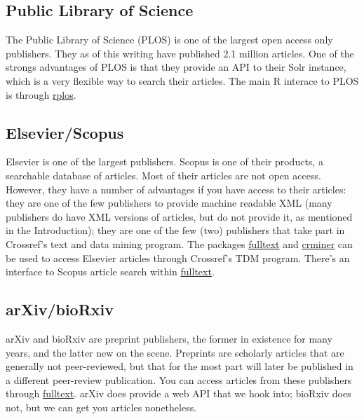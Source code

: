 \documentclass[author-year, review, 11pt]{components/elsarticle} %
\begin{document}
\hypertarget{public-library-of-science}{%
\subsection{Public Library of Science}\label{public-library-of-science}}

The Public Library of Science (PLOS) is one of the largest open access
only publishers. They as of this writing have published 2.1 million
articles. One of the strongs advantages of PLOS is that they provide an
API to their Solr instance, which is a very flexible way to search their
articles. The main R interace to PLOS is through
\href{https://github.com/ropensci/rplos}{rplos}.

\hypertarget{elsevierscopus}{%
\subsection{Elsevier/Scopus}\label{elsevierscopus}}

Elsevier is one of the largest publishers. Scopus is one of their
products, a searchable database of articles. Most of their articles are
not open access. However, they have a number of advantages if you have
access to their articles: they are one of the few publishers to provide
machine readable XML (many publishers do have XML versions of articles,
but do not provide it, as mentioned in the Introduction); they are one
of the few (two) publishers that take part in Crossref's text and data
mining program. The packages
\href{https://github.com/ropensci/fulltext}{fulltext} and
\href{https://github.com/ropensci/crminer}{crminer} can be used to
access Elsevier articles through Crossref's TDM program. There's an
interface to Scopus article search within
\href{https://github.com/ropensci/fulltext}{fulltext}.

\hypertarget{arxivbiorxiv}{%
\subsection{arXiv/bioRxiv}\label{arxivbiorxiv}}

arXiv and bioRxiv are preprint publishers, the former in existence for
many years, and the latter new on the scene. Preprints are scholarly
articles that are generally not peer-reviewed, but that for the most
part will later be published in a different peer-review publication. You
can access articles from these publishers through
\href{https://github.com/ropensci/fulltext}{fulltext}. arXiv does
provide a web API that we hook into; bioRxiv does not, but we can get
you articles nonetheless.
\end{document}

